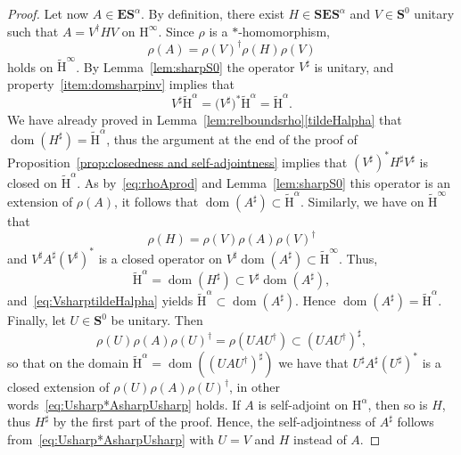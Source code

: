\documentclass[10pt]{amsart}
\theoremstyle{definition}\newtheorem{defi}[theo]{Definition}\newtheorem{rema}[theo]{Remark}\newtheorem{exam}[theo]{Example}\newtheorem{nota}[theo]{Notation}
\DeclareMathOperator{\dom}{dom}
\renewcommand{\mathsf}{\mathrm}
\newcommand{\sfH}{\mathsf{H}}
\newcommand{\BE}{\mathbf E}
\newcommand{\BS}{\mathbf S}
\renewcommand{\subseteq}{\subset}
\begin{document}
\begin{proof}
Let now $A\in\BE\BS^\alpha$. By definition, there exist $H\in\BS\BE\BS^\alpha$ and $V\in\BS^0$ unitary such that $A=V^\dagger HV$ on $\sfH^\infty$. Since $\rho$ is a $*$-homomorphism,
\begin{equation}\label{eq:rhoAprod}
\rho(A)=\rho(V)^\dagger \rho(H)\rho(V)
\end{equation}
holds on $\widetilde{\sfH}^\infty$. By Lemma~\ref{lem:sharpS0} the operator $V^\sharp$ is unitary, and property~\eqref{item:domsharpinv} implies that
\begin{equation}\label{eq:VsharptildeHalpha}
V^\sharp \widetilde{\sfH}^\alpha= \big(V^\sharp\big)^*\widetilde{\sfH}^\alpha=\widetilde{\sfH}^\alpha.
\end{equation}
We have already proved in Lemma~\ref{lem:relboundsrho}\eqref{tildeHalpha} that $\dom(H^\sharp)=\widetilde{\sfH}^\alpha$, thus the argument at the end of the proof of Proposition~\ref{prop:closedness and self-adjointness} implies that $(V^\sharp)^\ast H^\sharp V^\sharp$ is closed on $\widetilde{\sfH}^\alpha$. As by~\eqref{eq:rhoAprod} and Lemma~\ref{lem:sharpS0} this operator is an extension of $\rho(A)$, it follows that $\dom(A^\sharp)\subseteq\widetilde{\sfH}^\alpha$. Similarly, we have on $\widetilde{\sfH}^\infty$ that
\begin{equation}
\rho(H)=\rho(V)\rho(A)\rho(V)^\dagger
\end{equation}
and $V^\sharp A^\sharp (V^\sharp)^*$ is a closed operator on $V^\sharp\dom(A^\sharp)\subseteq \widetilde{\sfH}^\infty$. Thus,
\[
\widetilde{\sfH}^\alpha=\dom\left(H^\sharp\right)\subseteq
V^\sharp\dom\left(A^\sharp\right),
\]
and~\eqref{eq:VsharptildeHalpha} yields $\widetilde{\sfH}^\alpha\subseteq\dom(A^\sharp)$. Hence $\dom(A^\sharp)=\widetilde{\sfH}^\alpha$. Finally, let $U\in\BS^0$ be unitary. Then
\begin{equation}
\rho(U)\rho(A)\rho(U)^\dagger=\rho\left(U A U^\dagger\right)\subseteq \left(U A U^\dagger\right)^\sharp,
\end{equation}
so that on the domain $\widetilde{\sfH}^\alpha=\dom((U A U^\dagger)^\sharp)$ we have that $U^\sharp A^\sharp(U^\sharp)^*$ is a closed extension of $\rho(U) \rho(A)\rho(U)^\dagger$, in other words~\eqref{eq:Usharp*AsharpUsharp} holds. If $A$ is self-adjoint on $\sfH^\alpha$, then so is $H$, thus $H^\sharp$ by the first part of the proof. Hence, the self-adjointness of $A^\sharp$ follows from~\eqref{eq:Usharp*AsharpUsharp} with $U=V$ and $H$ instead of $A$.
\end{proof}
\end{document}
